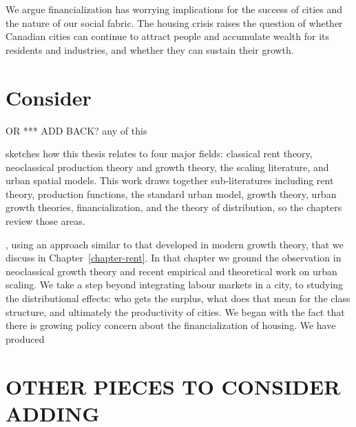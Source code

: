
We argue financialization %
has worrying implications for the success of cities and the nature of our social fabric. 
The housing crisis raises the question of whether Canadian cities can continue to attract people and accumulate wealth for its residents and industries, and whether they can sustain their growth.


\section{Consider}
OR *** ADD BACK? any of this


sketches how this thesis relates to four major fields: classical rent theory, neoclassical production theory and growth theory, the scaling literature, and urban spatial models. %
    This work draws together sub-literatures including rent theory, production functions, the standard urban model, growth theory, urban growth theories, financialization, and the theory of distribution, so the chapters review those areas. %

    , using an approach similar to that developed in modern growth theory, that we discuss in Chapter~\ref{chapter-rent}.  In that chapter we ground the observation in  \gls{neoclassical growth theory} and recent empirical and theoretical work on \gls{urban scaling}. 
 We take a step beyond integrating labour markets in a city, to studying the distributional effects: who gets the surplus, what does that mean for the class structure, and ultimately the productivity of cities. 
We began with the fact that there is growing policy concern about the financialization of  housing. We have produced 


\section{OTHER PIECES TO CONSIDER ADDING}


